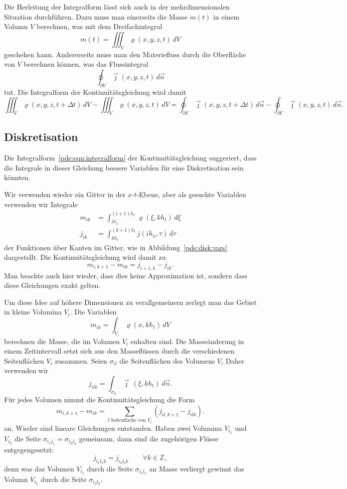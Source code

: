Die Herleitung der Integralform lässt sich auch in der mehrdimensionalen
Situation durchführen.
Dazu muss man einerseits die Masse $m(t)$ in einem Volumn $V$ berechnen,
was mit dem Dreifachintegral
\[
m(t)
=
\iiint_V \varrho(x,y,z,t) \,dV
\]
geschehen kann.
Andererseits muss man den Materiefluss durch die Oberfläche von $V$
berechnen können, was das Flussintegral
\[
\oint_{\partial V} \vec{\jmath}(x,y,z,t) \,d\vec{n}
\]
tut.
Die Integralform der Kontinuitätsgleichung wird damit
\[
\iiint_V \varrho(x,y,z,t+\Delta t) \,dV
-
\iiint_V \varrho(x,y,z,t) \,dV
=
\oint_{\partial V} \vec{\jmath}(x,y,z,t+\Delta t)\,d\vec{n}
-
\oint_{\partial V} \vec{\jmath}(x,y,z,t)\,d\vec{n}.
\]


\subsection{Diskretisation}
Die Integralform~\eqref{pde:eqn:integralform}
der Kontinuitätsgleichung suggeriert, dass die Integrale
in dieser Gleichung bessere Variablen für eine Diskretisation
sein könnten.

Wir verwenden wieder ein Gitter in der $x$-$t$-Ebene, aber 
als gesuchte Variablen verwenden wir Integrale
\begin{align*}
m_{ik}
&=
\int_{ih_x}^{(i+1)h_x} \varrho(\xi,kh_t)\,d\xi
\\
j_{ik}
&=
\int_{kh_t}^{(k+1)h_t} j(ih_x,\tau) \,d\tau
\end{align*}
der Funktionen über Kanten im Gitter, wie in Abbildung~\ref{pde:disk:vars}
dargestellt.
Die Kontinuitätsgleichung wird damit zu
\begin{equation}
m_{i,k+1}-m_{ik}
=
j_{i+1,k}-j_{ik}.
\label{pde:fvm:1dim}
\end{equation}
Man beachte auch hier wieder, dass dies keine Approximation ist, sondern
dass diese Gleichungen exakt gelten.

Um diese Idee auf höhere Dimensionen zu verallgemeinern zerlegt man
das Gebiet in kleine Volumina $V_i$.
Die Variablen
\[
m_{ik} = \int_{V_i} \varrho(x, kh_t)\, dV
\]
berechnen die Masse, die im Volumen $V_i$ enhalten sind.
Die Masseänderung in einem Zeitintervall setzt sich aus den
Masseflüssen durch die verschiedenen Seitenflächen $V_i$ 
zusammen.
Seien $\sigma_{il}$ die Seitenflächen des Volumens $V_i$
Daher verwenden wir 
\[
j_{ilk} = \int_{\sigma_{il}} \vec{\jmath}\,(\xi, kh_t)\,d\vec{n}.
\]
Für jedes Volumen nimmt die Kontinuitätsgleichung die Form
\begin{equation}
m_{i,k+1}-m_{ik}
=
\sum_{\text{$l$ Seitenfläche von $V_i$}} (j_{il,k+1}-j_{ilk}).
\label{pde:fvm:ndim}
\end{equation}
an.
Wieder sind lineare Gleichungen entstanden.
Haben zwei Volumina $V_{i_1}$ und $V_{i_2}$ die Seite
$\sigma_{i_1j_1}=\sigma_{i_2j_2}$ gemeinsam, dann sind die 
zugehörigen Flüsse entgegengesetzt:
\[
j_{i_1l_1k}=j_{i_2l_2k}
\qquad\forall k\in\mathbb Z,
\]
denn was das Volumen $V_{i_1}$ durch die Seite $\sigma_{i_1l_1}$ an
Masse verliergt gewinnt das Volumn $V_{i_2}$ durch die Seite
$\sigma_{i_2l_2}$.

